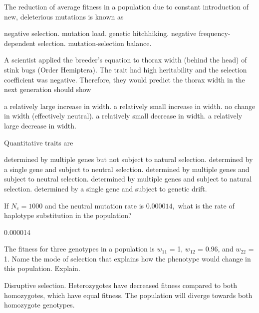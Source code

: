 \documentclass[12pt, addpoints]{exam}
\newcommand*\AnswerBox[2]{%
	\parbox[t][#1]{0.92\textwidth}{%
		\begin{solution}#2\end{solution}}
	\vspace{\stretch{1}}
}
\begin{document}
\begin{questions}
\question
The reduction of average fitness in a population due to constant introduction of new, deleterious mutations is known as

\begin{choices}
	\choice negative selection.
	\correctchoice mutation load.
	\choice genetic hitchhiking.
	\choice negative frequency-dependent selection.
	\choice mutation-selection balance.
\end{choices}

\question
A scientist applied the breeder's equation to thorax width (behind the head) of stink bugs (Order Hemiptera). The trait had high heritability and the selection coefficient was negative. Therefore, they would predict the thorax width in the next generation should show

\begin{choices}
\choice a relatively large increase in width.
\choice a relatively small increase in width.
\choice no change in width (effectively neutral).
\choice a relatively small decrease in width.
\correctchoice a relatively large decrease in width.
\end{choices}

\newpage

\question
Quantitative traits are

\begin{choices}
\choice determined by multiple genes but not subject to natural selection.
\choice determined by a single gene and subject to neutral selection.
\choice determined by multiple genes and subject to neutral selection.
\correctchoice determined by multiple genes and subject to natural selection.
\choice determined by a single gene and subject to genetic drift.
\end{choices}

\question[2]
If $N_e = 1000$ and the neutral mutation rate is $0.000014,$ what is the rate of haplotype substitution in the population?

\AnswerBox{0.01\textheight}{0.000014}

\question[5]
The fitness for three genotypes in a population is $w_{11}$ = 1, $w_{12}$ = 0.96, and $w_{22}$ = 1. Name the mode of selection that explains how the phenotype would change in this population. Explain.

\AnswerBox{0.05\textheight}{%
Disruptive selection. Heterozygotes have decreased fitness compared to both homozygotes, which have equal fitness. The population will diverge towards both homozygote genotypes.
}



\end{questions}
\end{document}
